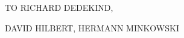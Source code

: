 \begin{center}
\vspace*{6cm}

{\Large TO RICHARD DEDEKIND,}

\vspace{1.5cm}
{\Large DAVID HILBERT, HERMANN MINKOWSKI}

\vspace{1.5cm}

\vspace{1.5cm}
{\small{}}
\end{center}
